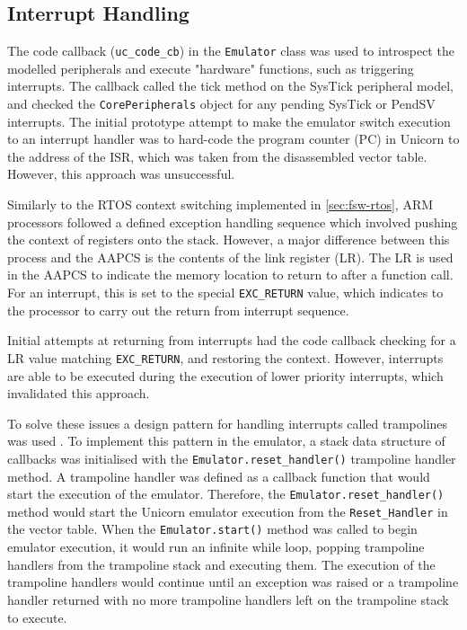 \documentclass[../report.tex]{subfiles}
\begin{document}
\subsection{Interrupt Handling} \label{sec:emu-isr}

The code callback (\lstinline|uc_code_cb|) in the \lstinline|Emulator| class
was used to introspect the modelled peripherals and execute "hardware"
functions, such as triggering interrupts. The callback called the tick method
on the SysTick peripheral model, and checked the \lstinline|CorePeripherals|
object for any pending SysTick or PendSV interrupts. The initial prototype
attempt to make the emulator switch execution to an interrupt handler was to
hard-code the program counter (PC) in Unicorn to the address of the ISR, which
was taken from the disassembled vector table. However, this approach was
unsuccessful.

Similarly to the RTOS context switching implemented in \autoref{sec:fsw-rtos}, ARM
processors followed a defined exception handling sequence \citep{ARM_Exception}
which involved pushing the context of registers onto the stack. However, a
major difference between this process and the AAPCS \citep{AAPCS} is the
contents of the link register (LR). The LR is used in the AAPCS to indicate the
memory location to return to after a function call. For an interrupt, this is
set to the special \lstinline|EXC_RETURN| value, which indicates to the
processor to carry out the return from interrupt sequence.

Initial attempts at returning from interrupts had the code callback checking
for a LR value matching \lstinline|EXC_RETURN|, and restoring the context.
However, interrupts are able to be executed during the execution of lower
priority interrupts, which invalidated this approach.

To solve these issues a design pattern for handling interrupts called
trampolines was used \citep{trampoline}. To implement this pattern in the
emulator, a stack data structure of callbacks was initialised with the
\lstinline|Emulator.reset_handler()| trampoline handler method. A trampoline
handler was defined as a callback function that would start the execution of
the emulator. Therefore, the \lstinline|Emulator.reset_handler()| method would start
the Unicorn emulator execution from the \lstinline|Reset_Handler| in the vector
table. When the \lstinline|Emulator.start()| method was called to begin
emulator execution, it would run an infinite while loop, popping trampoline
handlers from the trampoline stack and executing them. The execution of the
trampoline handlers would continue until an exception was raised or a
trampoline handler returned with no more trampoline handlers left on the
trampoline stack to execute.
\end{document}
